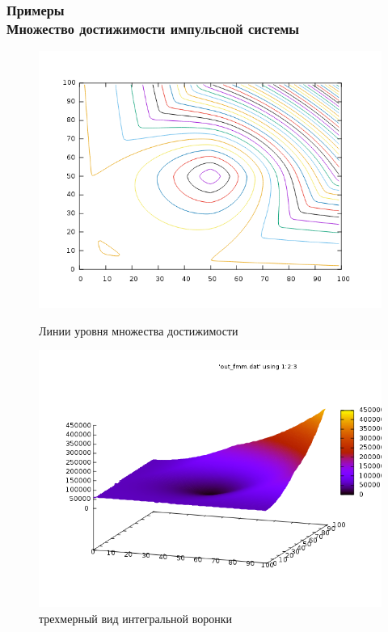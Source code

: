 \documentclass[hyperref={unicode=true},professionalfont]{beamer}
\newcommand{\stamp}{
	\begin{frame}[plain,noframenumbering]
		\begin{table}[h!]
			\flushright
			\vspace{5cm}
			\begin{adjustbox}{max width=0.7\textwidth}
				\begin{tabular}{
					|>{\footnotesize}p{0.8cm}|
					>{\footnotesize}p{0.8cm}|
					>{\footnotesize}p{2.2cm}|
					>{\footnotesize}p{1.1cm}|
					>{\footnotesize}p{0.8cm}|
					>{\footnotesize}p{5cm}|
					>{\footnotesize}p{0.1cm}|
					>{\footnotesize}p{0.1cm}|
					>{\footnotesize}p{0.1cm}|
					>{\footnotesize}p{0.8cm}|
					>{\footnotesize}p{1.4cm}|
				}
					\hline
					&&&&& \multicolumn{6}{>{\footnotesize}c|}{\multirow{3}{*}{\Large 0.043.00.00 ПЗ}} \\ \cline{1-5}
					&&&&& \multicolumn{6}{>{\footnotesize}c|}{} \\ \cline{1-5}
					Изм. & Лист & № Документа & Подпись & Дата & \multicolumn{6}{>{\footnotesize}c|}{} \\ \hline
					\multicolumn{2}{|>{\footnotesize}l|}{Разработал}
                    & Апанович Д.В. &  &  &
                                            \multirow{4}{5cm}{\centering
                                            Параллельный алгоритм
                                            численного решения
                                            анизотропного уравнения эйконала} & \multicolumn{3}{>{\footnotesize}l|}{Лит.} & Лист & Листов \\ \cline{1-5}\cline{7-11}
					\multicolumn{2}{|>{\footnotesize}l|}{Проверил}
                    & Казаков А.Л. &  &  &  & У & & & \insertframenumber & \inserttotalframenumber \\ \cline{1-5}\cline{7-11}
					\multicolumn{2}{|>{\footnotesize}l|}{Нормоконтролер}
                    & Казаков А.Л. &  &  &  & \multicolumn{5}{>{\footnotesize}l|}{} \\ \cline{1-5}
					\multicolumn{2}{|>{\footnotesize}l|}{} &  &  &  &  & \multicolumn{5}{>{\footnotesize}l|}{Кафедра АС, гр. ИСТм-16-1} \\ \cline{1-5}
					\multicolumn{2}{|>{\footnotesize}l|}{Утвердил}
                    & Бахвалов С.В. &  &  &  & \multicolumn{5}{>{\footnotesize}l|}{} \\ \hline

				\end{tabular}
			\end{adjustbox}
		\end{table}

	\end{frame}
}
\renewcommand{\stamp}{}
\begin{document}
\begin{frame}
  \frametitle{Примеры \\ Множество достижимости импульсной системы}

  \begin{figure}[ht]
    \begin{minipage}[h]{0.49\linewidth}
      \centering
      \includegraphics[width=0.9\linewidth]{impulse-example-levels.png}
      \hfil \caption{Линии уровня множества достижимости }
      \label{fig:eikonal-surface}

    \end{minipage}
    \begin{minipage}[ht]{0.49\linewidth}
      \centering
      \includegraphics[width=0.9\linewidth]{impulse-example.png}
      \hfil \caption{трехмерный вид интегральной воронки}
      \label{fig:barier_surface}
    \end{minipage}
  \end{figure}

\end{frame}
\stamp
\end{document}
